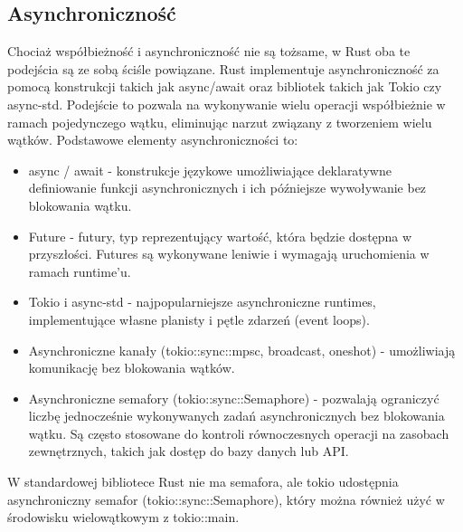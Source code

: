 \subsection{Asynchroniczność}
Chociaż współbieżność i asynchroniczność nie są tożsame, w Rust oba te podejścia są ze sobą ściśle powiązane. Rust implementuje asynchroniczność za pomocą konstrukcji takich jak async/await oraz bibliotek takich jak Tokio czy async-std. Podejście to pozwala na wykonywanie wielu operacji współbieżnie w ramach pojedynczego wątku, eliminując narzut związany z tworzeniem wielu wątków.
Podstawowe elementy asynchroniczności to:
\begin{itemize}
    \item async / await - konstrukcje językowe umożliwiające deklaratywne definiowanie funkcji asynchronicznych i ich późniejsze wywoływanie bez blokowania wątku.
    \item Future - futury, typ reprezentujący wartość, która będzie dostępna w przyszłości. Futures są wykonywane leniwie i wymagają uruchomienia w ramach runtime’u.
    \item Tokio i async-std - najpopularniejsze asynchroniczne runtimes, implementujące własne planisty i pętle zdarzeń (event loops).
    \item Asynchroniczne kanały (tokio::sync::mpsc, broadcast, oneshot) - umożliwiają komunikację bez blokowania wątków.
    \item Asynchroniczne semafory (tokio::sync::Semaphore) - pozwalają ograniczyć liczbę jednocześnie wykonywanych zadań asynchronicznych bez blokowania wątku. Są często stosowane do kontroli równoczesnych operacji na zasobach zewnętrznych, takich jak dostęp do bazy danych lub API.
\end{itemize}
W standardowej bibliotece Rust nie ma semafora, ale tokio udostępnia asynchroniczny semafor (tokio::sync::Semaphore), który można również użyć w środowisku wielowątkowym z tokio::main.

